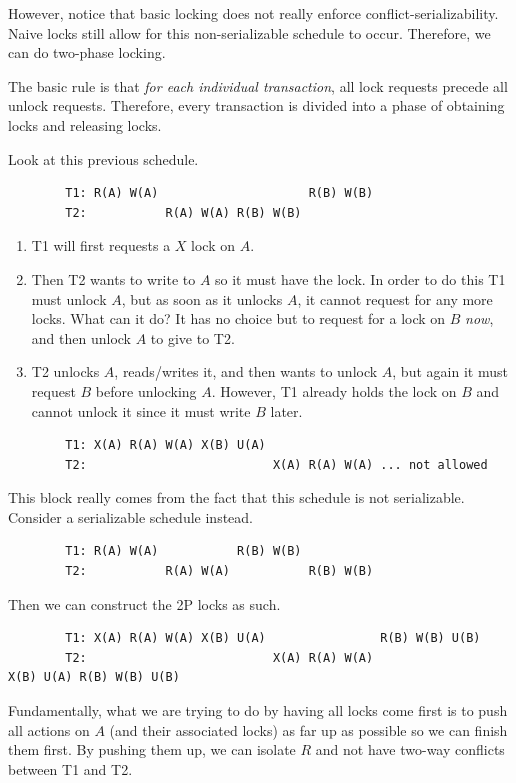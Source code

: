     However, notice that basic locking does not really enforce conflict-serializability. Naive locks still allow for this non-serializable schedule to occur. Therefore, we can do two-phase locking. 

    \begin{definition}
      The basic rule is that \textit{for each individual transaction}, all lock requests precede all unlock requests. Therefore, every transaction is divided into a phase of obtaining locks and releasing locks.   
    \end{definition}

    \begin{example}[2PL]
      Look at this previous schedule. 
      \begin{lstlisting}
        T1: R(A) W(A)                     R(B) W(B)
        T2:           R(A) W(A) R(B) W(B) 
      \end{lstlisting}
      \begin{enumerate}
        \item T1 will first requests a $X$ lock on $A$. 
        \item Then T2 wants to write to $A$ so it must have the lock. In order to do this T1 must unlock $A$, but as soon as it unlocks $A$, it cannot request for any more locks. What can it do? It has no choice but to request for a lock on $B$ \textit{now}, and then unlock $A$ to give to T2. 
        \item T2 unlocks $A$, reads/writes it, and then wants to unlock $A$, but again it must request $B$ before unlocking $A$. However, T1 already holds the lock on $B$ and cannot unlock it since it must write $B$ later. 
      \end{enumerate}
      \begin{lstlisting} 
        T1: X(A) R(A) W(A) X(B) U(A) 
        T2:                          X(A) R(A) W(A) ... not allowed
      \end{lstlisting}
      This block really comes from the fact that this schedule is not serializable. Consider a serializable schedule instead. 
      \begin{lstlisting} 
        T1: R(A) W(A)           R(B) W(B)
        T2:           R(A) W(A)           R(B) W(B) 
      \end{lstlisting} 
      Then we can construct the 2P locks as such. 
      \begin{lstlisting}
        T1: X(A) R(A) W(A) X(B) U(A)                R(B) W(B) U(B) 
        T2:                          X(A) R(A) W(A)                X(B) U(A) R(B) W(B) U(B) 
      \end{lstlisting}
      Fundamentally, what we are trying to do by having all locks come first is to push all actions on $A$ (and their associated locks) as far up as possible so we can finish them first. By pushing them up, we can isolate $R$ and not have two-way conflicts between T1 and T2. 
    \end{example}

